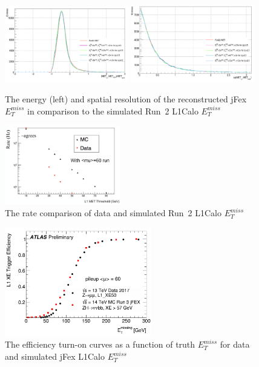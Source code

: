 \begin{figure}[!h]                
	\includegraphics[width=0.48\textwidth]{Chapter6/res_et.png}
	\includegraphics[width=0.48\textwidth]{Chapter6/res_phi.png}
	\begin{center}
		\caption{The energy (left) and spatial resolution of the reconstructed jFex $E^{miss}_{T}$ in comparison to the simulated Run~2 L1Calo $E^{miss}_{T}$}
		\label{Fig:res_met}            
	\end{center}
\end{figure}
\begin{figure}[!h]                
	\includegraphics[width=0.45\textwidth]{Chapter6/rate_datamc.png}
	\begin{center}
		\caption{The rate comparison of data and simulated Run~2 L1Calo $E^{miss}_{T}$}
		\label{Fig:rate_datamc}            
	\end{center}
\end{figure}
\begin{figure}[!h]                
	\includegraphics[width=0.57\textwidth]{Chapter6/perf_met.png}
	\begin{center}
		\caption{The efficiency turn-on curves as a function of truth $E^{miss}_{T}$ for data and simulated jFex L1Calo $E^{miss}_{T}$}
		\label{Fig:perf_met}            
	\end{center}
\end{figure}
